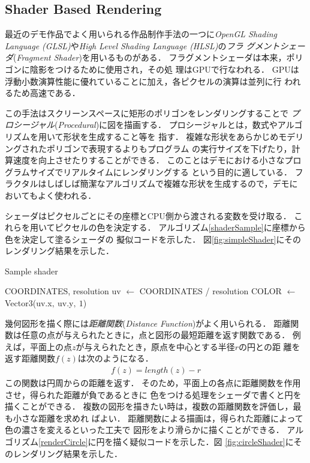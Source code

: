 \subsection{Shader Based Rendering}

最近のデモ作品でよく用いられる作品制作手法の一つに\textit{OpenGL Shading
Language (GLSL)}や\textit{High Level Shading Language (HLSL)}の\emph{フラ
グメントシェーダ}(\textit{Fragment Shader})を用いるものがある．
フラグメントシェーダは本来，ポリゴンに陰影をつけるために使用され，その処
理はGPUで行なわれる．
GPUは浮動小数演算性能に優れていることに加え，各ピクセルの演算は並列に行
われるため高速である．

この手法はスクリーンスペースに矩形のポリゴンをレンダリングすることで
\emph{プロシージャル}(\textit{Procedural})に図を描画する．
プロシージャルとは，数式やアルゴリズムを用いて形状を生成すること等を
指す．
複雑な形状をあらかじめモデリングされたポリゴンで表現するよりもプログラム
の実行サイズを下げたり，計算速度を向上させたりすることができる．
このことはデモにおける小さなプログラムサイズでリアルタイムにレンダリングする
という目的に適している．
フラクタルはしばしば簡潔なアルゴリズムで複雑な形状を生成するので，デモに
おいてもよく使われる．

シェーダはピクセルごとにその座標とCPU側から渡される変数を受け取る．
これらを用いてピクセルの色を決定する．
アルゴリズム\ref{shaderSample}に座標から色を決定して塗るシェーダの
擬似コードを示した．
図\ref{fig:simpleShader}にそのレンダリング結果を示した．
\begin{algorithm}
 \begin{algorithmic}
  \begin{minipage}{0.5\hsize}
   \caption{Sample shader}
   \label{shaderSample}
   \REQUIRE COORDINATES, resolution
   \STATE uv $\leftarrow$ COORDINATES / resolution
   \STATE COLOR $\leftarrow$ Vector3(uv.x$,~$uv.y$,~1$)
  \end{minipage}
 \end{algorithmic}
\end{algorithm}

幾何図形を描く際には\emph{距離関数}(\textit{Distance Function})がよく用いられる．
距離関数は任意の点が与えられたときに，点と図形の最短距離を返す関数である．
例えば，平面上の点$z$が与えられたとき，原点を中心とする半径$r$の円との距
離を返す距離関数$f(z)$は次のようになる．
\begin{align*}
 f(z) =  length(z) - r
\end{align*}
この関数は円周からの距離を返す．
そのため，平面上の各点に距離関数を作用させ，得られた距離が負であるときに
色をつける処理をシェーダで書くと円を描くことができる．
複数の図形を描きたい時は，複数の距離関数を評価し，最も小さな距離を求めれ
ばよい．
距離関数による描画は，得られた距離によって色の濃さを変えるといった工夫で
図形をより滑らかに描くことができる．
アルゴリズム\ref{renderCircle}に円を描く疑似コードを示した．図
\ref{fig:circleShader}にそのレンダリング結果を示した．

